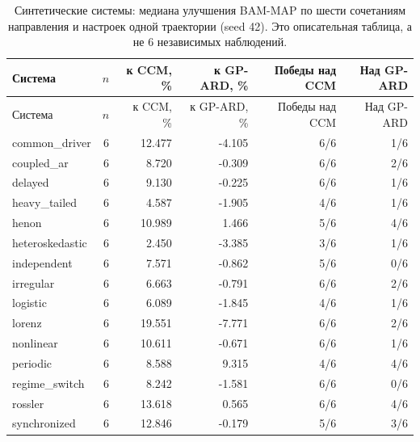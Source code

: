 \begin{longtable}{lrrrrr}
\caption{Синтетические системы: медиана улучшения BAM-MAP по шести сочетаниям направления и настроек одной траектории (seed 42). Это описательная таблица, а не 6 независимых наблюдений.}\label{tab:grid}\\
\toprule
Система & $n$ & к CCM, \% & к GP-ARD, \% & Победы над CCM & Над GP-ARD \\
\midrule
\endfirsthead
\toprule
Система & $n$ & к CCM, \% & к GP-ARD, \% & Победы над CCM & Над GP-ARD \\
\midrule
\endhead
common\_driver & 6 & 12.477 & -4.105 & 6/6 & 1/6 \\
coupled\_ar & 6 & 8.720 & -0.309 & 6/6 & 2/6 \\
delayed & 6 & 9.130 & -0.225 & 6/6 & 1/6 \\
heavy\_tailed & 6 & 4.587 & -1.905 & 4/6 & 1/6 \\
henon & 6 & 10.989 & 1.466 & 5/6 & 4/6 \\
heteroskedastic & 6 & 2.450 & -3.385 & 3/6 & 1/6 \\
independent & 6 & 7.571 & -0.862 & 5/6 & 0/6 \\
irregular & 6 & 6.663 & -0.791 & 6/6 & 2/6 \\
logistic & 6 & 6.089 & -1.845 & 4/6 & 1/6 \\
lorenz & 6 & 19.551 & -7.771 & 6/6 & 2/6 \\
nonlinear & 6 & 10.611 & -0.671 & 6/6 & 1/6 \\
periodic & 6 & 8.588 & 9.315 & 4/6 & 4/6 \\
regime\_switch & 6 & 8.242 & -1.581 & 6/6 & 0/6 \\
rossler & 6 & 13.618 & 0.565 & 6/6 & 4/6 \\
synchronized & 6 & 12.846 & -0.179 & 5/6 & 3/6 \\
\bottomrule
\end{longtable}
